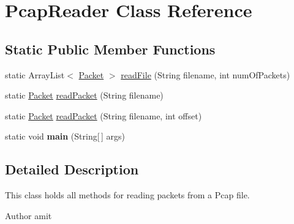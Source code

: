 \hypertarget{class_pcap_reader}{\section{Pcap\-Reader Class Reference}
\label{class_pcap_reader}
}
\subsection*{Static Public Member Functions}
\begin{DoxyCompactItemize}
\item 
static Array\-List$<$ \hyperlink{class_packet}{Packet} $>$ \hyperlink{class_pcap_reader_a2b96ae4b1eeab28b808aa3bb2f6bcafd}{read\-File} (String filename, int num\-Of\-Packets)
\item 
static \hyperlink{class_packet}{Packet} \hyperlink{class_pcap_reader_a52de923b89cbe077fa30ab1fafc3d4c8}{read\-Packet} (String filename)
\item 
static \hyperlink{class_packet}{Packet} \hyperlink{class_pcap_reader_a3d07d30f780c0ecf09ab6b8d38930dbb}{read\-Packet} (String filename, int offset)
\item 
\hypertarget{class_pcap_reader_a3f57ae8d5071abdf1c3de086d2b1f892}{static void {\bfseries main} (String\mbox{[}$\,$\mbox{]} args)}\label{class_pcap_reader_a3f57ae8d5071abdf1c3de086d2b1f892}

\end{DoxyCompactItemize}


\subsection{Detailed Description}
This class holds all methods for reading packets from a Pcap file. \begin{DoxyAuthor}{Author}
amit 
\end{DoxyAuthor}


